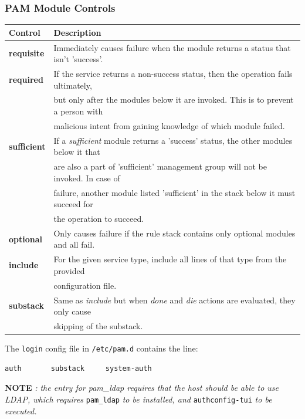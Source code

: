 \subsubsection{PAM Module Controls}
\vspace{-10pt}
\begin{tabular}{ll}
	\toprule
	\textbf{Control} &\textbf{Description} \\
	\midrule
	\textbf{requisite} &Immediately causes failure when the module returns a status that isn't 'success'. \\	
	\textbf{required} &If the service returns a non-success status, then the operation fails ultimately, \\&but only after the modules below it are invoked. This is to prevent a person with \\&malicious intent from gaining knowledge of which module failed. \\	
	\textbf{sufficient} &If a \textit{sufficient} module returns a 'success' status, the other modules below it that \\&are also a part of 'sufficient' management group will not be invoked. In case of \\&failure, another module listed 'sufficient' in the stack below it must succeed for \\&the operation to succeed. \\
	\textbf{optional} &Only causes failure if the rule stack contains only optional modules and all fail. \\
	\midrule
	\textbf{include} &For the given service type, include all lines of that type from the provided \\&configuration file. \\
	\textbf{substack} &Same as \textit{include} but when \textit{done} and \textit{die} actions are evaluated, they only cause \\&skipping of the substack. \\
	\bottomrule
\end{tabular}

The \verb|login| config file in \verb|/etc/pam.d| contains the line:
\vspace{-10pt}
\begin{verbatim}
auth       substack     system-auth
\end{verbatim}

\noindent
\textbf{NOTE} \textit{: the entry for pam\_ldap requires that the host should be able to use LDAP, which requires} \verb|pam_ldap| \textit{to be installed, and} \verb|authconfig-tui| \textit{to be executed.}

